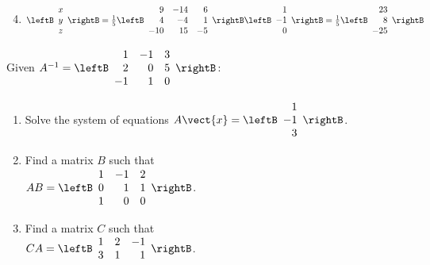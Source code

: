 \begin{multicols}{2}
\begin{ex}
\begin{sol}
\begin{enumerate}[label={\alph*.}]
\setcounter{enumi}{3}
\item $\leftB \begin{array}{c}
x \\
y \\
z
\end{array} \rightB = \frac{1}{5} \leftB \begin{array}{rrr}
9 & -14 & 6 \\
4 & -4 & 1 \\
-10 & 15 & -5
\end{array} \rightB \leftB \begin{array}{r}
1 \\
-1 \\
0
\end{array} \rightB = \frac{1}{5} \leftB \begin{array}{r}
23 \\
8 \\
-25
\end{array} \rightB$

\end{enumerate}
\end{sol}
\end{ex}

\begin{ex}
Given $A^{-1} = \leftB \begin{array}{rrr}
1 & -1 & 3 \\
2 & 0 & 5 \\
-1 & 1 & 0
\end{array} \rightB$:

\begin{enumerate}[label={\alph*.}]
\item Solve the system of equations $A\vect{x} = \leftB \begin{array}{r}
1 \\
-1 \\
3
\end{array} \rightB$.

\item Find a matrix $B$ such that \\ $AB = \leftB \begin{array}{rrr}
1 & -1 & 2 \\
0 & 1 & 1 \\
1 & 0 & 0
\end{array} \rightB$.

\item Find a matrix $C$ such that \\ $CA = \leftB \begin{array}{rrr}
1 & 2 & -1 \\
3 & 1 & 1
\end{array} \rightB$.


\end{enumerate}
\end{ex}
\end{multicols}
